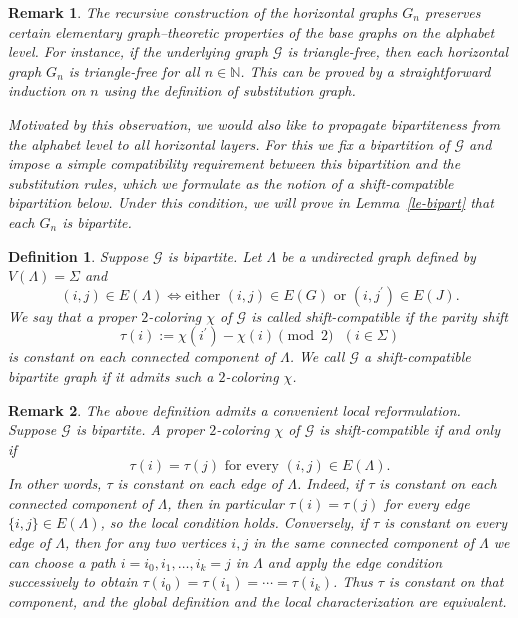 \documentclass[reqno]{amsart}
\theoremstyle{plain}
\newtheorem{definition}{Definition}
\newtheorem{remark}{Remark}
\numberwithin{equation}{section}
\begin{document}
\begin{remark}
The recursive construction of the horizontal graphs $G_{n}$ preserves
certain elementary graph--theoretic properties of the base graphs on the
alphabet level. For instance, if the underlying graph $\mathcal{G}$ is
triangle-free, then each horizontal graph $G_{n}$ is triangle-free for all $%
n\in \mathbb{N}$. This can be proved by a straightforward induction on $n$
using the definition of substitution graph.

Motivated by this observation, we would also like to propagate bipartiteness
from the alphabet level to all horizontal layers. For this we fix a
bipartition of $\mathcal{G}$ and impose a simple compatibility requirement
between this bipartition and the substitution rules, which we formulate as
the notion of a \emph{shift-compatible} bipartition below. Under this
condition, we will prove in Lemma~\ref{le-bipart} that each $G_{n}$ is
bipartite.
\end{remark}

\begin{definition}
Suppose $\mathcal{G}$ is bipartite. Let $\Lambda $ be a undirected graph
defined by $V(\Lambda )=\Sigma $ and%
\begin{equation}
(i,j)\in E(\Lambda )\iff \text{either }(i,j)\in E(G)\text{ or }(i,j^{\prime
})\in E(J).  \label{Lambda}
\end{equation}%
We say that a proper $2$-coloring $\chi $ of $\mathcal{G}$ is called \emph{%
shift-compatible} if the parity shift 
\begin{equation*}
\tau (i):=\chi (i^{\prime })-\chi (i)\pmod2\text{ }(i\in \Sigma )
\end{equation*}%
is constant on each connected component of $\Lambda $. We call $\mathcal{G}$
a \emph{shift-compatible bipartite graph }if it admits such a $2$-coloring $%
\chi $.
\end{definition}

\begin{remark}
\label{rmk-equi}The above definition admits a convenient local
reformulation. Suppose $\mathcal{G}$ is bipartite. A proper $2$-coloring $%
\chi $ of $\mathcal{G}$ is shift-compatible if and only if 
\begin{equation}
\tau (i)=\tau (j)\text{ for every }(i,j)\in E(\Lambda ).  \label{shift-c}
\end{equation}%
In other words, $\tau $ is constant on each edge of $\Lambda $. Indeed, if $%
\tau $ is constant on each connected component of $\Lambda $, then in
particular $\tau (i)=\tau (j)$ for every edge $\{i,j\}\in E(\Lambda )$, so
the local condition holds. Conversely, if $\tau $ is constant on every edge
of $\Lambda $, then for any two vertices $i,j$ in the same connected
component of $\Lambda $ we can choose a path $i=i_{0},i_{1},\dots ,i_{k}=j$
in $\Lambda $ and apply the edge condition successively to obtain $\tau
(i_{0})=\tau (i_{1})=\cdots =\tau (i_{k})$. Thus $\tau $ is constant on that
component, and the global definition and the local characterization are
equivalent.
\end{remark}
\end{document}
